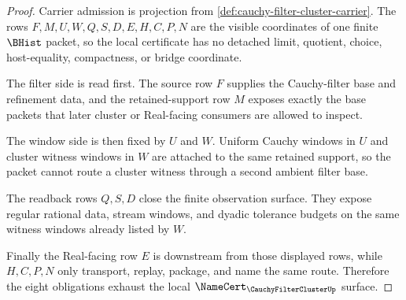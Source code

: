 \begin{proof}
Carrier admission is projection from \autoref{def:cauchy-filter-cluster-carrier}. The rows $F,M,U,W,Q,S,D,E,H,C,P,N$ are the visible coordinates of one finite $\BHist$ packet, so the local certificate has no detached limit, quotient, choice, host-equality, compactness, or bridge coordinate.

The filter side is read first. The source row $F$ supplies the Cauchy-filter base and refinement data, and the retained-support row $M$ exposes exactly the base packets that later cluster or Real-facing consumers are allowed to inspect.

The window side is then fixed by $U$ and $W$. Uniform Cauchy windows in $U$ and cluster witness windows in $W$ are attached to the same retained support, so the packet cannot route a cluster witness through a second ambient filter base.

The readback rows $Q,S,D$ close the finite observation surface. They expose regular rational data, stream windows, and dyadic tolerance budgets on the same witness windows already listed by $W$.

Finally the Real-facing row $E$ is downstream from those displayed rows, while $H,C,P,N$ only transport, replay, package, and name the same route. Therefore the eight obligations exhaust the local $\NameCert_{\CauchyFilterClusterUp}$ surface.
\end{proof}

